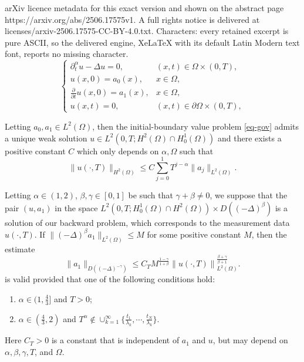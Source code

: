 \documentclass[10pt,a4paper]{amsart}
\begin{document}
arXiv licence metadata for this exact version and shown on the abstract page https://arxiv.org/abs/2506.17575v1. A full rights notice is delivered at licenses/arxiv-2506.17575-CC-BY-4.0.txt. Characters: every retained excerpt is pure ASCII, so the delivered engine, XeLaTeX with its default Latin Modern text font, reports no missing character.
\begin{equation}\label{eq-gov}
\begin{cases}
  \partial_t^\alpha u - \Delta u = 0, & (x,t) \in \Omega \times (0,T), \\
  u(x,0) = a_0(x), & x \in \Omega, \\
  \frac{\partial}{\partial t}u(x,0) = a_1(x), & x \in \Omega, \\
  u(x,t) = 0, & (x,t) \in \partial \Omega \times (0,T),
\end{cases}
\end{equation}

\begin{lemma}\label{lem-forward}
Letting $a_0,a_1\in L^2(\Omega)$, then the initial-boundary value problem \eqref{eq-gov} admits a unique weak solution $u\in L^2(0,T;H^2(\Omega)\cap H_0^1(\Omega))$ and there exists a positive constant $C$ which only depends on $\alpha,\Omega$ such that
$$
\|u(\cdot, T)\|_{H^2(\Omega)} \le C \sum_{j=0}^1 T^{j-\alpha} \|a_j\|_{L^2(\Omega)}.
$$
\end{lemma}

\begin{theorem}\label{thm-condi-sup}
Letting $\alpha\in(1,2)$, $\beta,\gamma\in [0,1]$ be such that $\gamma+\beta\neq0$, we suppose that the pair $(u,a_1)$ in the space $L^2 \left(0,T; H_0^1(\Omega) \cap H^2(\Omega) \right) \times D((-\Delta)^{\beta})$ is a solution of our backward problem, which corresponds to the measurement data $u(\cdot,T)$. If $\|(-\Delta)^{\beta} a_1\|_{L^2(\Omega)} \le M$ for some positive constant $M$, then the estimate
$$
\|a_1\|_{D((-\Delta)^{-\gamma})}\le  C_T M^{\frac{1-\gamma}{1+\beta}} \left\| u(\cdot, T)\right\|_{L^2(\Omega)}^{\frac{\beta+\gamma}{\beta+1}}.
$$
is valid provided that one of the following conditions hold:
\begin{enumerate}[label = \roman*.]
    \item $\alpha\in(1,\frac43]$ and $T>0$;
    \item $\alpha\in(\frac43,2)$ and $T^\alpha \not\in \cup_{k=1}^\infty \{ \frac{t_1}{\lambda_k}, \cdots, \frac{t_N}{\lambda_k}\}$.
\end{enumerate}
Here $C_T>0$ is a constant that is independent of $a_1$ and $u$, but may depend on $\alpha,\beta,\gamma,T$, and $\Omega$.
\end{theorem}
\end{document}
